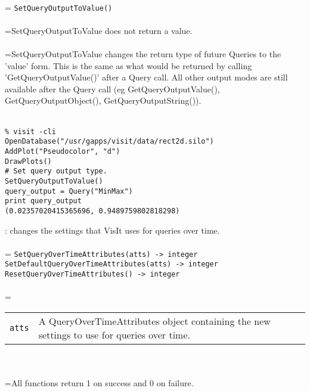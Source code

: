\documentclass[10pt,a4paper]{report}
\begin{document}
 \\ 
\hangindent=\parindent 
\verb!SetQueryOutputToValue()!\\ [-3mm]

 \\ 
\hangindent=\parindent SetQueryOutputToValue does not return a value. \\[-3mm] 

 \\ 
\hangindent=\parindent SetQueryOutputToValue changes the return type of future Queries to the 'value' form. This is the same as what would be returned by calling 'GetQueryOutputValue()' after a Query call. All other output modes are still available after the Query call (eg GetQueryOutputValue(), GetQueryOutputObject(), GetQueryOutputString()). \\[-3mm] 

\\[-6mm]
\begin{verbatim}% visit -cli
OpenDatabase("/usr/gapps/visit/data/rect2d.silo")
AddPlot("Pseudocolor", "d")
DrawPlots()
# Set query output type.
SetQueryOutputToValue()
query_output = Query("MinMax")
print query_output
(0.02357020415365696, 0.9489759802818298)
\end{verbatim}
\newpage


{}
: changes the settings that VisIt uses for queries over time.\\[-3mm]

 \\ 
\hangindent=\parindent 
\verb!SetQueryOverTimeAttributes(atts) -> integer!\\ 
\verb!SetDefaultQueryOverTimeAttributes(atts) -> integer!\\ 
\verb!ResetQueryOverTimeAttributes() -> integer!\\ [-3mm]

 \\ 
\hangindent=\parindent 
\begin{tabular}{lp{9cm}}
\verb!atts! & A QueryOverTimeAttributes object containing the new settings to use for queries over time. \\
\end{tabular} \\[-2mm]


 \\ 
\hangindent=\parindent All functions return 1 on success and 0 on failure. \\[-3mm] 
\end{document}
